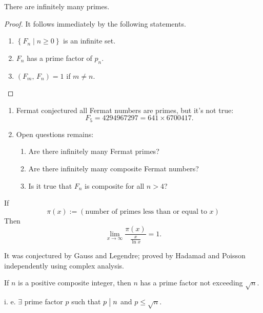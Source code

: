 \begin{corollary}
    There are infinitely many primes.
\end{corollary}

\begin{proof}
    It follows immediately by the following statements.

    \begin{enumerate}
        \item $\left\{F_n \mid n\geq 0\right\}$ is an infinite set.
        \item $F_n$ has a prime factor of $p_n$.
        \item $\left(F_m,\,F_n\right)=1$ if $m \neq n$.
    \end{enumerate}
\end{proof}

\begin{remark}
    \begin{enumerate}
        \item Fermat conjectured all Fermat numbers are primes, but it's not true:
        \[F_5 = 4294967297 = 641 \times 6700417.\]
        \item Open questions remains:
        \begin{enumerate}
            \item Are there infinitely many Fermat primes?
            \item Are there infinitely many composite Fermat numbers?
            \item Is it true that $F_n$ is composite for all $n>4$?
        \end{enumerate}
    \end{enumerate}
\end{remark}

\begin{theorem}
    If
    \[
        \pi\left(x\right) := \left(\mbox{number of primes less than or equal to $x$}\right)
    \]
    Then
    \[
        \lim_{x\rightarrow \infty} \frac{\pi\left(x\right)}{\frac{x}{\ln x}} = 1.    
    \]
\end{theorem}
It was conjectured by Gauss and Legendre; proved by Hadamad and Poisson independently
using complex analysis.

\begin{theorem}
    If $n$ is a positive composite integer, then $n$ has a prime factor
    not exceeding $\sqrt{n}$.

    i. e. $\exists$ prime factor $p$ such that $p \bigm| n$ and $p \leq \sqrt{n}$.
\end{theorem}

